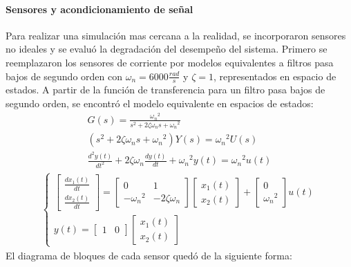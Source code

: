 \documentclass[a4paper, 10pt, onecolumn,journal]{ieeeconf}
\begin{document}
\paragraph{\textbf{Sensores y acondicionamiento de señal}} 
Para realizar una simulación mas cercana a la realidad, se incorporaron sensores no ideales y se evaluó la degradación del desempeño del sistema.
Primero se reemplazaron los sensores de corriente por modelos equivalentes a filtros pasa bajos de segundo orden con $\omega_n=6000\frac{rad}{s}$ y $\zeta = 1$, representados en espacio de estados.
A partir de la función de transferencia para un filtro pasa bajos de segundo orden, se encontró el modelo equivalente en espacios de estados:
\begin{align}
	G(s) = \frac{{\omega_n}^2}{s^2 + 2 \zeta \omega_n s + {\omega_n}^2}\\
	\left(s^2 + 2 \zeta \omega_n s + {\omega_n}^2 \right) Y(s)={\omega_n}^2 U(s)\\
	\frac{d^2 y(t)}{dt^2} + 2 \zeta \omega_n \frac{d y(t)}{dt} + {\omega_n}^2 y(t) = {\omega_n}^2 u(t) 
\end{align}
\begin{align}
	\begin{cases}
		\begin{bmatrix}
			\frac{d x_1(t)}{dt} \\ 
			\frac{d x_2(t)}{dt}
		\end{bmatrix} = 
		\begin{bmatrix}
			0 & 1 \\ 
			-{\omega_n}^2 & - 2 \zeta \omega_n
		\end{bmatrix}
		\begin{bmatrix}
			x_1(t) \\ 
			x_2(t)
		\end{bmatrix} + 
		\begin{bmatrix}
			0 \\
			{\omega_n}^2
		\end{bmatrix} u(t) \\
		y(t) = \begin{bmatrix}
			1 & 0
		\end{bmatrix} 
		\begin{bmatrix}
			x_1(t) \\ 
			x_2(t)
		\end{bmatrix}
	\end{cases}\label{ecuacion matricial de sensor corriente}
\end{align}
El diagrama de bloques de cada sensor quedó de la siguiente forma:
\end{document}
